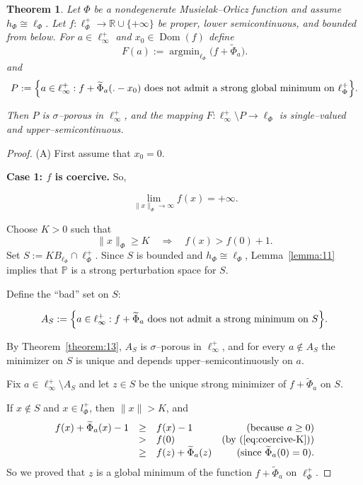\documentclass[12pt]{article}
\theoremstyle{thmstyleone}%
\newtheorem{theorem}{Theorem}
\theoremstyle{thmstyletwo}%
\theoremstyle{thmstylethree}%
\begin{document}
{{{{ 
\begin{theorem}\label{theorem:12}
Let $\Phi$ be a nondegenerate Musielak--Orlicz function and assume 
$h_\Phi \cong \ell_\Phi$.  
Let $f:\ell_\Phi^+\to\mathbb{R}\cup\{+\infty\}$ be proper, lower semicontinuous,
and bounded from below.  
For $a\in\ell_\infty^+$ and $x_0\in  \operatorname{Dom}(f)$ define
\[
F(a) := \operatorname{argmin}_{\ell_\Phi}\bigl(f+\widetilde{\Phi}_a\bigr).
\]
and
\[
P := 
\Bigl\{
a\in\ell_\infty^+ :
f+\widetilde{\Phi}_a(.-x_0) 
\text{ does not admit a strong global minimum on }\ell_\Phi^+
\Bigr\}.
\]


Then $P$ is $\sigma$--porous in $\ell_\infty^+$, and the mapping 
$F:\ell_\infty^+\setminus P\to\ell_\Phi$ is single--valued and 
upper--semicontinuous.
\end{theorem}

\begin{proof} (A) First assume that $x_0=0$.

\textbf{Case 1: $f$ is coercive.} So,


\[
\lim_{\|x\|_\Phi\to\infty} f(x)=+\infty.
\]

Choose $K>0$ such that
\begin{equation}\label{eq:coercive-K}
\|x\|_\Phi\ge K \quad\Longrightarrow\quad 
f(x) > f(0)+1.
\end{equation}
Set $S:=K B_{\ell_\Phi}\cap \ell_\Phi^+$.  
Since $S$ is bounded and $h_\Phi\cong\ell_\Phi$, Lemma~\ref{lemma:11} implies
that $\mathbb{P}$ is a strong perturbation space for $S$.

Define the ``bad'' set on $S$:


\[
A_S :=
\Bigl\{
a\in\ell_\infty^+ :
f+\widetilde{\Phi}_a 
\text{ does not admit a strong minimum on }S
\Bigr\}.
\]


By Theorem~\ref{theorem:13}, $A_S$ is $\sigma$--porous in $\ell_\infty^+$, and
for every $a\notin A_S$ the minimizer on $S$ is unique and depends 
upper--semicontinuously on $a$.

Fix $a\in\ell_\infty^+\setminus A_S$ and let 
$z\in S$ be the unique strong minimizer of $f+\widetilde{\Phi}_a$ on $S$.
 
If $x\not\in S$ and $x\in l_\Phi^+$, then $\|x\|>K$, and
	$$
	\begin{array}{lllr}
		f(x)+\widetilde{\Phi}_a(x)-1&\geq&f(x)-1&(\mbox{because}\ a\geq 0)\\
		&>&f(0)&(\mbox{by}\ (\ref{eq:coercive-K}))\\
		&\geq&f(z)+\widetilde{\Phi}_a(z) &(\mbox{since $\widetilde{\Phi}_a(0)=0$}).
	\end{array}
	$$
	So we proved that $z$ is a global minimum of the function $f+\widetilde{\Phi}_a$ on $\ell_\Phi^+$.
 

\end{proof}}}}}
\end{document}
